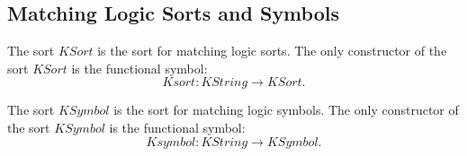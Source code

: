\documentclass[UTF8]{article}
\theoremstyle{plain}
\theoremstyle{definition}
\theoremstyle{remark}
\newcommand{\KString}{\mathit{KString}}
\newcommand{\KSort}{\mathit{KSort}}
\newcommand{\Ksort}{\mathit{Ksort}}
\newcommand{\KSymbol}{\mathit{KSymbol}}
\newcommand{\Ksymbol}{\mathit{Ksymbol}}
\begin{document}
\subsection{Matching Logic Sorts and Symbols}

The sort $\KSort$ is the sort for matching logic sorts.
The only constructor of the sort $\KSort$ is the functional symbol:
\begin{equation*}
\Ksort \colon \KString \to \KSort.
\end{equation*}

The sort $\KSymbol$ is the sort for matching logic symbols.
The only constructor of the sort $\KSymbol$ is the functional symbol:
\begin{equation*}
\Ksymbol \colon \KString \to \KSymbol.
\end{equation*}
\end{document}
